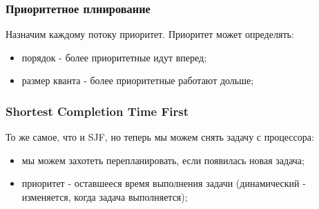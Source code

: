 \begin{frame}
\frametitle{Приоритетное плнирование}

Назначим каждому потоку приоритет. Приоритет может определять:
\begin{itemize}
  \item порядок - более приоритетные идут вперед;
  \item размер кванта - более приоритетные работают дольше;
\end{itemize}

\end{frame}

\begin{frame}
\frametitle{Shortest Completion Time First}

То же самое, что и SJF, но теперь мы можем снять задачу с процессора:
\begin{itemize}
  \item мы можем захотеть перепланировать, если появилась новая задача;
  \item приоритет - оставшееся время выполнения задачи (динамический - изменяется, когда задача выполняется);
\end{itemize}
\end{frame}

